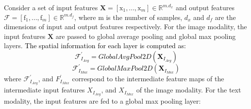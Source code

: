 \documentclass[twocolumn]{svjour3}
\begin{document}
Consider a set of input features $\mathbf{X} = [\mathrm{x}_{1},...,\mathrm{x}_{m}] \in \mathbb{R}^{{m}.{d}_{x}}$ and output features $\mathcal{F} = [\mathrm{f}_{1},...,\mathrm{f}_{m}] \in \mathbb{R}^{{m}.{d}_{f}}$, where $\mathrm{m}$ is the number of samples,  ${d}_{x}$ and ${d}_{f}$ are the dimensions of input and output features respectively. For the image modality, the input features $\mathbf{X}$ are passed to global average pooling and global max pooling layers. \textcolor{black}{The spatial information for each layer is computed as:}
\textcolor{black}{
\begin{equation}
    \mathcal{F}^{'}_{{I}_{Avg}} = GlobalAvgPool2D (\mathbf{X}_{{I}_{Avg}})
 \label{eq:equation1}
\end{equation}
}
\textcolor{black}{
\begin{equation}
    \mathcal{F}^{'}_{{I}_{Max}} = GlobalMaxPool2D (\mathbf{X}_{{I}_{Max}})  
\label{eq:equation1_1}
\end{equation}
}
where $\mathcal{F}^{'}_{{I}_{Avg}}$, and ${F}^{'}_{{I}_{Max}}$ correspond to the intermediate feature maps of the intermediate input features ${X}_{{I}_{Avg}}$, and ${X}_{{I}_{Max}}$ of the image modality.
For the text modality, the input features are fed to a global max pooling layer:
\end{document}
